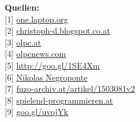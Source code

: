 \documentclass[10pt,a4paper,ngerman,twoside]{article} %
\newcommand{\SepRule}{\noindent	%
\begin{center}
\rule{250pt}{1pt} %
\end{center}
}
\begin{document}
\textbf{Quellen:} \\
{[}1{]} \href{http://one.laptop.org/}{one.laptop.org} \\
{[}2{]} \href{http://christoph-d.blogspot.co.at/}{christoph-d.blogspot.co.at} \\
{[}3{]} \href{http://olpc.at}{olpc.at} \\
{[}4{]} \href{http://www.olpcnews.com/}{olpcnews.com} \\
{[}5{]} \href{https://en.wikipedia.org/wiki/Sugar_(desktop_environment)}{http://goo.gl/1SE4Xm} \\
{[}6{]} \href{https://de.wikipedia.org/wiki/Nicholas_Negroponte}{Nikolas Negroponte} \\
{[}7{]} \href{http://www.fuzo-archiv.at/artikel/1503081v2}{fuzo-archiv.at/artikel/1503081v2} \\
{[}8{]} \href{http://spielend-programmieren.at}{spielend-programmieren.at} \\
{[}9{]} \href{http://www.olpcnews.com/commentary/olpc_news/happy_new_year_from_olpc_news.html}{goo.gl/uvojYk}

\end{document}

